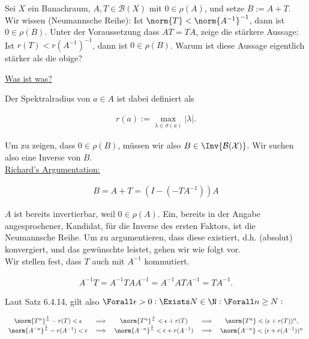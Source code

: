 \begin{exercise}[22/1]

Sei $X$ ein Banachraum, $A, T \in \mathcal{B}(X)$ mit $0 \in \rho(A)$, und setze $B := A + T$.
Wir wissen (Neumannsche Reihe):
Ist $\norm{T} < \norm{A^{-1}}^{-1}$, dann ist $0 \in \rho(B)$.
Unter der Voraussetzung dass $A T = T A$, zeige die stärkere Aussage:
Ist $r(T) < r(A^{-1})^{-1}$, dann ist $0 \in \rho(B)$.
Warum ist diese Aussage eigentlich stärker als die obige?

\end{exercise}

\begin{solution}

\underline{Was ist was?}


Der Spektralradius von $a \in A$ ist dabei definiert als

\begin{align*}
  r(a)
  :=
  \max_{\lambda \in \sigma(a)} |\lambda|.
\end{align*}

Um zu zeigen, dass $0 \in \rho(B)$, müssen wir also $B \in \Inv{\mathcal{B(X)}}$.
Wir suchen also eine Inverse von $B$. \\

\underline{Richard's Argumentation:}

\begin{align*}
  B
  =
  A + T
  =
  (I - (-T A^{-1})) A
\end{align*}

$A$ ist bereits invertierbar, weil $0 \in \rho(A)$.
Ein, bereits in der Angabe angesprochener, Kandidat, für die Inverse des ersten Faktors, ist die Neumannsche Reihe.
Um zu argumentieren, dass diese existiert, d.h. (absolut) konvergiert, und das gewünschte leistet, gehen wir wie folgt vor. \\

Wir stellen fest, dass $T$ auch mit $A^{-1}$ kommutiert.

\begin{align}
    A^{-1} T
    =
    A^{-1} T A A^{-1}
    =
    A^{-1} A T A^{-1}
    = T A^{-1}.
\end{align}


Laut Satz 6.4.14, gilt also $\Forall \epsilon > 0: \Exists N \in \N: \Forall n \geq N:$

\begin{align*}
\begin{array}{ccccc}
  \norm{T^n}^\frac{1}{n} - r(T) < \epsilon &
  \implies &
  \norm{T^n}^\frac{1}{n} < \epsilon + r(T) &
  \implies &
  \norm{T^n} < (\epsilon + r(T))^n, \\
  \norm{A^{-n}}^\frac{1}{n} - r(A^{-1}) < \epsilon &
  \implies &
  \norm{A^{-n}}^\frac{1}{n} < \epsilon + r(A^{-1}) &
  \implies &
  \norm{A^{-n}} < (\epsilon + r(A^{-1}))^n
\end{array}
\end{align*}


\end{solution}
